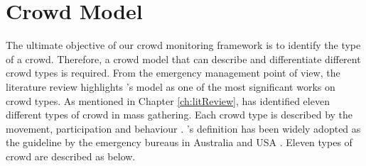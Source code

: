 \section{Crowd Model}

The ultimate objective of our crowd monitoring framework is to identify the type of a crowd. Therefore, a crowd model that can describe and differentiate different crowd types is required. From the emergency management point of view, the literature review highlights \citet{Berlonghi1995}'s model as one of the most significant works on crowd types. As mentioned in Chapter \ref{ch:litReview}, \citet{Berlonghi1995} has identified eleven different types of crowd in mass gathering. Each crowd type is described by the movement, participation and behaviour \citep{Zeitz2009}. \citet{Berlonghi1995}'s definition has been widely adopted as the guideline by the emergency bureaus in Australia \citep{EMA1999} and USA \citep{FEMA2005}. Eleven types of crowd are described as below.
